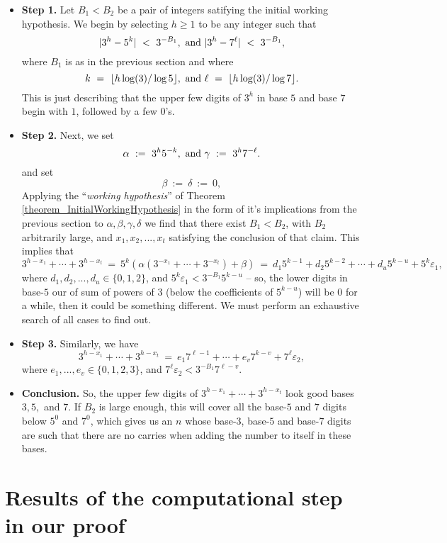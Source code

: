 \documentclass[12pt]{article}
\begin{document}
\begin{itemize} 

\item \textbf{Step 1.} 
Let $B_1 < B_2$ be a pair of integers satifying the initial working hypothesis. 
We begin by selecting $h \geq 1$ to be any integer such that 
$$
|3^h - 5^k|\ <\ 3^{-B_1},\ {\rm and\ } 
|3^h - 7^\ell|\ <\ 3^{-B_1},
$$
where $B_1$ is as in the previous section and where
$$
k\ =\ \lfloor h \log(3) / \log 5 \rfloor,\ {\rm and\ } \ell\ =\ 
\lfloor h \log(3) / \log 7 \rfloor.
$$
This is just describing that the upper few digits of $3^h$ in base $5$ and base
$7$ begin with $1$, followed by a few $0$'s.  

\item \textbf{Step 2.} 
Next, we set 
$$
\alpha\ :=\ 3^h 5^{-k},\ {\rm and\ }\gamma\ :=\ 3^h 7^{-\ell}.
$$
and set
$$
\beta\ :=\ \delta\ :=\ 0,
$$ 
Applying the ``\emph{working hypothesis}'' of Theorem \ref{theorem_InitialWorkingHypothesis} in the 
form of it's implications from the previous section to 
$\alpha,\beta, \gamma, \delta$ we find that there exist $B_1 < B_2$,
with $B_2$ arbitrarily large, 
and $x_1, x_2, ..., x_t$ satisfying the conclusion of that claim.  
This implies that
$$
3^{h-x_1} + \cdots + 3^{h-x_t}\ =\ 5^k ( \alpha (3^{-x_1} + \cdots + 
3^{-x_t}) + \beta)\ =\ d_1 5^{k-1} + d_2 5^{k-2} + \cdots + d_u 5^{k-u}
+ 5^k \varepsilon_1,   
$$
where $d_1,d_2,...,d_u \in \{0,1,2\}$, and 
$5^k \varepsilon_1 < 3^{-B_1} 5^{k-u}$ -- so, the lower digits in base-$5$
our of sum of powers of $3$ (below the coefficients of $5^{k-u}$) 
will be $0$ for a while, then it could be something
different. We must perform an exhaustive search of all cases to find out.  

\item \textbf{Step 3.} 
Similarly, we have
$$
3^{h-x_1} + \cdots + 3^{h-x_t}\ =\ e_1 7^{\ell-1} + \cdots + e_v 7^{k-v}
+ 7^\ell \varepsilon_2,
$$
where $e_1,...,e_v \in \{0,1,2,3\}$, and $7^\ell \varepsilon_2 < 
3^{-B_1} 7^{\ell-v}$.

\item \textbf{Conclusion.} 
So, the upper few digits of $3^{h-x_1} + \cdots + 3^{h-x_t}$ look good
bases $3,5,$ and $7$.  If $B_2$ is large enough, this will cover all 
the base-$5$ and $7$ digits below $5^0$ and $7^0$, which gives us an $n$
whose base-$3$, base-$5$ and base-$7$ digits are such that there are no
carries when adding the number to itself in these bases. 
\end{itemize} 

\section{Results of the computational step in our proof} 
\label{Section_CompStep} 
\end{document}
